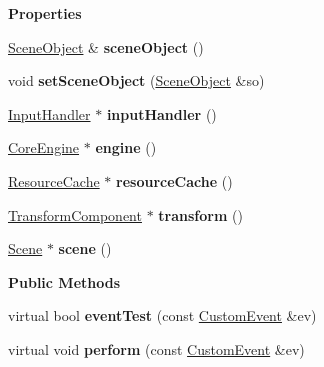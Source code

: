 \begin{Indent}\textbf{ Properties}\par
\begin{DoxyCompactItemize}
\item 
\mbox{\label{classrev_1_1_script_listener_acc9e3a16fbb2a509eca35469f9140ba5}} 
\mbox{\hyperlink{classrev_1_1_scene_object}{Scene\+Object}} \& {\bfseries scene\+Object} ()
\item 
\mbox{\label{classrev_1_1_script_listener_ac0fd831d9545db3381ad6063c48210ae}} 
void {\bfseries set\+Scene\+Object} (\mbox{\hyperlink{classrev_1_1_scene_object}{Scene\+Object}} \&so)
\item 
\mbox{\label{classrev_1_1_script_listener_a279bcc6e5c2f0ff186573a2873379005}} 
\mbox{\hyperlink{classrev_1_1_input_handler}{Input\+Handler}} $\ast$ {\bfseries input\+Handler} ()
\item 
\mbox{\label{classrev_1_1_script_listener_a3dd9293ba93fd5a7444deb00ab7094ff}} 
\mbox{\hyperlink{classrev_1_1_core_engine}{Core\+Engine}} $\ast$ {\bfseries engine} ()
\item 
\mbox{\label{classrev_1_1_script_listener_a3ade023750daf6ffa92af682f4cc0aa1}} 
\mbox{\hyperlink{classrev_1_1_resource_cache}{Resource\+Cache}} $\ast$ {\bfseries resource\+Cache} ()
\item 
\mbox{\label{classrev_1_1_script_listener_a04fc58563023fe49dbad15121f7d6e20}} 
\mbox{\hyperlink{classrev_1_1_transform_component}{Transform\+Component}} $\ast$ {\bfseries transform} ()
\item 
\mbox{\label{classrev_1_1_script_listener_ae8315305f7c75212c9203b0d74bc1257}} 
\mbox{\hyperlink{classrev_1_1_scene}{Scene}} $\ast$ {\bfseries scene} ()
\end{DoxyCompactItemize}
\end{Indent}
\begin{Indent}\textbf{ Public Methods}\par
\begin{DoxyCompactItemize}
\item 
\mbox{\label{classrev_1_1_script_listener_aacc675ce4b8f85db5e192a9c0078cd8a}} 
virtual bool {\bfseries event\+Test} (const \mbox{\hyperlink{classrev_1_1_custom_event}{Custom\+Event}} \&ev)
\item 
\mbox{\label{classrev_1_1_script_listener_a24251022b2a79d28bc843833e49fd58c}} 
virtual void {\bfseries perform} (const \mbox{\hyperlink{classrev_1_1_custom_event}{Custom\+Event}} \&ev)
\end{DoxyCompactItemize}
\end{Indent}
